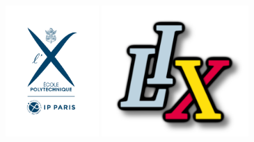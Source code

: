 \documentclass{report}
\begin{document}
\begin{titlepage}
\begin{figure}[h]
    \begin{minipage}[c]{.46\linewidth}
        \centering
        \includegraphics[height= 5cm]{École_polytechnique_signature.svg.png}
    \end{minipage}
    \begin{minipage}[c]{.46\linewidth}
        \centering
        \includegraphics[height=5cm]{logo_lix.png}
    \end{minipage}
\end{figure}
\vfill %
\end{titlepage}
\tableofcontents
\end{document}
